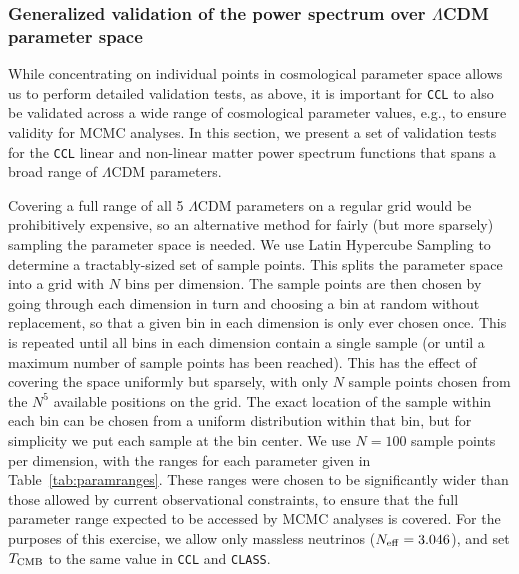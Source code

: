 \documentclass[\docopts]{\docclass}
\newcommand{\ccl}{{\tt CCL}\xspace}
\newcommand{\class}{{\tt CLASS}\xspace}
\begin{document}
\subsubsection{Generalized validation of the power spectrum over $\Lambda$CDM parameter space}
\label{ss:classval2}

While concentrating on individual points in cosmological parameter space allows us to perform detailed validation tests, as above, it is important for \ccl to also be validated across a wide range of cosmological parameter values, e.g., to ensure validity for MCMC analyses. In this section, we present a set of validation tests for the \ccl linear and non-linear matter power spectrum functions that spans a broad range of $\Lambda$CDM parameters.

Covering a full range of all 5 $\Lambda$CDM parameters on a regular grid would be prohibitively expensive, so an alternative method for fairly (but more sparsely) sampling the parameter space is needed. We use Latin Hypercube Sampling to determine a tractably-sized set of sample points. This splits the parameter space into a grid with $N$ bins per dimension. The sample points are then chosen by going through each dimension in turn and choosing a bin at random without replacement, so that a given bin in each dimension is only ever chosen once. This is repeated until all bins in each dimension contain a single sample (or until a maximum number of sample points has been reached). This has the effect of covering the space uniformly but sparsely, with only $N$ sample points chosen from the $N^5$ available positions on the grid. The exact location of the sample within each bin can be chosen from a uniform distribution within that bin, but for simplicity we put each sample at the bin center. We use $N=100$ sample points per dimension, with the ranges for each parameter given in Table~\ref{tab:paramranges}. These ranges were chosen to be significantly wider than those allowed by current observational constraints, to ensure that the full parameter range expected to be accessed by MCMC analyses is covered. For the purposes of this exercise, we allow only massless neutrinos ($N_{\rm eff} = 3.046$), and set $T_{\rm CMB}$ to the same value in \ccl and \class.
\end{document}
